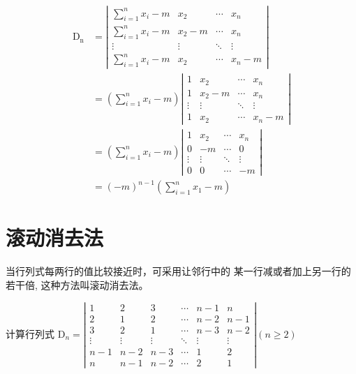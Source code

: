 \begin{solution}
$$
\begin{aligned}
    \mathrm{D}_{\mathrm{n}}&=
    \left|\begin{array}{cccc}
    \displaystyle\sum_{i=1}^{n} x_{i}-m & x_{2} & \cdots & x_{n} \\
    \displaystyle\sum_{i=1}^{n} x_{i}-m & x_{2}-m & \cdots & x_{n} \\
    \vdots & \vdots & \ddots & \vdots \\
    \displaystyle\sum_{i=1}^{n} x_{i}-m & x_{2} & \cdots & x_{n}-m
    \end{array}\right|\\
    &=\left(\sum_{i=1}^{n} x_{i}-m\right)
    \left|\begin{array}{cccc}
    1 & x_{2} & \cdots & x_{n} \\
    1 & x_{2}-m & \cdots & x_{n} \\
    \vdots & \vdots & \ddots & \vdots \\
    1 & x_{2} & \cdots & x_{n}-m
    \end{array}\right|\\
    &=\left(\sum_{i=1}^{n} x_{i}-m\right)
    \left|
    \begin{array}{cccc}
    1 & x_{2} & \cdots & x_{n} \\
    0 & -m & \cdots & 0 \\ \vdots & \vdots & \ddots & \vdots \\
    0 & 0 & \cdots & -m
    \end{array}\right|\\
    &=(-m)^{n-1}\left(\sum_{i=1}^{n} x_{1}-m\right)
\end{aligned}
$$
\end{solution}

\section{滚动消去法}
当行列式每两行的值比较接近时，可采用让邻行中的
某一行减或者加上另一行的若干倍, 这种方法叫滚动消去法。

\begin{example}
    计算行列式 
$\mathrm{D}_{n}=\left|\begin{array}{cccccc}
1 & 2 & 3 & \cdots & n-1 & n \\
2 & 1 & 2 & \cdots & n-2 & n-1 \\
3 & 2 & 1 & \cdots & n-3 & n-2 \\
\vdots & \vdots & \vdots & \ddots & \vdots & \vdots \\
n-1 & n-2 & n-3 & \cdots & 1 & 2\\
n & n-1 & n-2 & \cdots & 2 & 1
\end{array}\right|(n \geq 2)$
\end{example}


